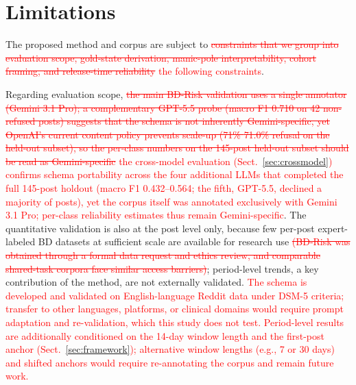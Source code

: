 \documentclass[runningheads]{llncs}
\newcommand{\rev}[1]{\textcolor{red}{#1}}
\newcommand{\del}[1]{\textcolor{red}{\sout{#1}}}
\newcommand{\rev}[1]{#1}
\newcommand{\del}[1]{}
\begin{document}
\section{Limitations}

The proposed method and corpus are subject to \del{constraints that we group into evaluation scope, gold-state derivation, manic-pole interpretability, cohort framing, and release-time reliability} \rev{the following constraints}.

Regarding evaluation scope, \del{the main BD-Risk validation uses a single annotator (Gemini 3.1 Pro); a complementary GPT-5.5 probe (macro F1 0.710 on 42 non-refused posts) suggests that the schema is not inherently Gemini-specific, yet OpenAI's current content policy prevents scale-up (\del{71\% }\rev{71.0\%} refusal on the held-out subset), so the per-class numbers on the 145-post held-out subset should be read as Gemini-specific} \rev{the cross-model evaluation (Sect.~\ref{sec:crossmodel}) confirms schema portability across the four additional LLMs that completed the full 145-post holdout (macro F1 0.432--0.564; the fifth, GPT-5.5, declined a majority of posts), yet the corpus itself was annotated exclusively with Gemini 3.1 Pro; per-class reliability estimates thus remain Gemini-specific}. The quantitative validation is also at the post level only, because few per-post expert-labeled BD datasets at sufficient scale are available for research use\del{ (BD-Risk was obtained through a formal data request and ethics review, and comparable shared-task corpora face similar access barriers)}; period-level trends, a key contribution of the method, are not externally validated. \rev{The schema is developed and validated on English-language Reddit data under DSM-5 criteria; transfer to other languages, platforms, or clinical domains would require prompt adaptation and re-validation, which this study does not test. Period-level results are additionally conditioned on the 14-day window length and the first-post anchor (Sect.~\ref{sec:framework}); alternative window lengths (e.g., 7 or 30 days) and shifted anchors would require re-annotating the corpus and remain future work.}
\end{document}
